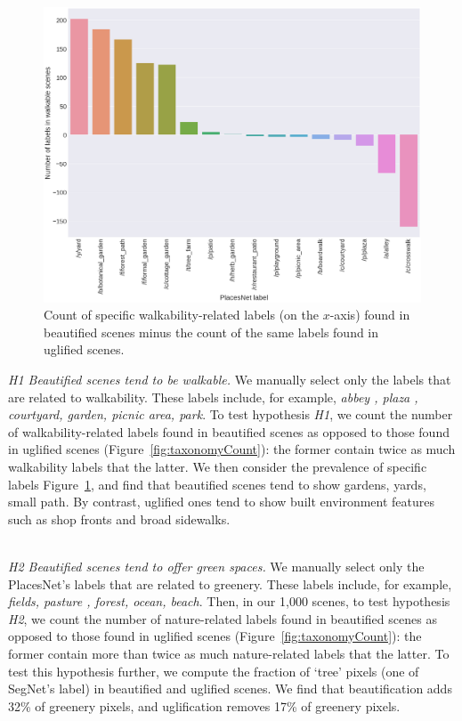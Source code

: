 \begin{figure}[h]
	\centering
	\includegraphics[width=\columnwidth]{Plot/walkable_taxonomy.png}
	\caption{Count of specific walkability-related labels  (on the $x$-axis) found in beautified scenes minus the count of the same labels found in uglified scenes.}
	\label{fig:WalkableTnomy}
\end{figure}


\noindent
\emph{H1 Beautified scenes tend to be walkable.}
We manually select only the labels that are related to walkability. These labels include, for example, \textit{abbey , plaza , courtyard, garden, picnic area, park}. To test hypothesis \emph{H1}, we count the number of walkability-related labels found in beautified scenes as opposed to those found in uglified scenes (Figure~\ref{fig:taxonomyCount}): the former contain twice as much walkability labels that the latter. We then consider the prevalence of specific labels Figure~\ref{fig:WalkableTnomy}, and  find that beautified scenes tend to show gardens, yards, small path. By contrast, uglified ones tend to show built environment features such as shop fronts and broad sidewalks. 


\mbox{ } \\
\noindent
\emph{H2 Beautified scenes tend to offer green spaces.}
We manually select only the PlacesNet's labels that are related to greenery. These labels include, for example, \textit{fields, pasture , forest, ocean, beach}. Then, in our 1,000 scenes, to test hypothesis \emph{H2}, we count the number of nature-related labels found in beautified scenes as opposed to those found in uglified scenes (Figure~\ref{fig:taxonomyCount}): the former contain more than twice as much nature-related labels that the latter.  To test this hypothesis further, we compute the fraction of `tree' pixels (one of SegNet's label) in beautified and uglified scenes. We find that beautification adds  32\% of greenery pixels, and uglification removes 17\% of greenery pixels. 


